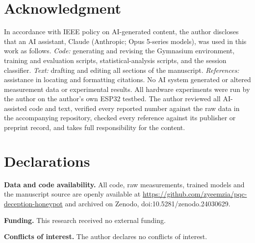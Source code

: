 \documentclass[conference]{IEEEtran}
\begin{document}
\section*{Acknowledgment}
In accordance with IEEE policy on AI-generated content, the author discloses
that an AI assistant, Claude (Anthropic; Opus 5-series models), was used in
this work as follows. \emph{Code:} generating and revising the Gymnasium
environment, training and evaluation scripts, statistical-analysis scripts,
and the session classifier. \emph{Text:} drafting and editing all sections of
the manuscript. \emph{References:} assistance in locating and formatting
citations. No AI system generated or altered measurement data or
experimental results. All hardware experiments
were run by the author on the author's own ESP32 testbed. The author reviewed
all AI-assisted code and text, verified every reported number against the raw
data in the accompanying repository, checked every reference against its
publisher or preprint record, and takes full responsibility for the content.

\section*{Declarations}
\textbf{Data and code availability.} All code, raw measurements, trained
models and the manuscript source are openly available at
\url{https://github.com/zyeemzia/pqc-deception-honeypot} and archived on
Zenodo, doi:10.5281/zenodo.24030629.

\textbf{Funding.} This research received no external funding.

\textbf{Conflicts of interest.} The author declares no conflicts of interest.
\end{document}
